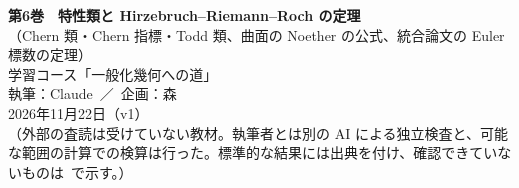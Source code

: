 
\usepackage{tikz}
\usepackage{tikz-cd}
\usetikzlibrary{arrows.meta,positioning,calc}
\newcommand{\Oc}{\mathcal O}
\newcommand{\CP}{\mathbb{CP}}
\newcommand{\Ker}{\operatorname{Ker}}
\newcommand{\Coker}{\operatorname{Coker}}
\newcommand{\Ahat}{\widehat{A}}
\newcommand{\Lg}{\mathsf{L}}
\newcommand{\Sym}{\operatorname{Sym}}
\newcommand{\PD}{\operatorname{PD}}
\newcommand{\sgn}{\operatorname{sign}}
\newcommand{\Fl}{\mathrm{Fl}}
\newcommand{\tw}{\mathsf{e}}
\renewcommand{\contentsname}{目次}\renewcommand{\figurename}{図}
\usepackage{fontspec}\newfontfamily{}
\newcommand{\Cech}{{\lmfont \v{C}ech}}

\sloppy
\begin{center}
{\LARGE\bfseries\sffamily 第6巻　特性類と Hirzebruch--Riemann--Roch の定理}\\[4pt]
{\large\sffamily （Chern 類・Chern 指標・Todd 類、曲面の Noether の公式、統合論文の Euler 標数の定理）}\\[8pt]
{\large 学習コース「一般化幾何への道」}\\[6pt]
{\large 執筆：Claude\ ／\ 企画：森}\\[3pt]
2026年11月22日（v1）\\[3pt]
{\small （外部の査読は受けていない教材。執筆者とは別の AI による独立検査と、可能な範囲の計算での検算は行った。標準的な結果には出典を付け、確認できていないものは\tQ\ で示す。）}
\end{center}

